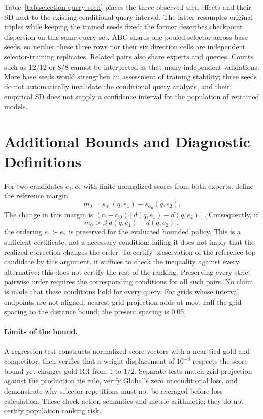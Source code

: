 \documentclass[11pt,a4paper]{article}
\begin{document}
Table~\ref{tab:selection-query-seed} places the three observed seed effects and their SD next to the existing conditional query interval. The latter resamples original triples while keeping the trained seeds fixed; the former describes checkpoint dispersion on this same query set. ADC shares one pooled selector across base seeds, so neither these three rows nor their six direction cells are independent selector-training replicates. Related pairs also share experts and queries. Counts such as 12/12 or 8/8 cannot be interpreted as that many independent validations. More base seeds would strengthen an assessment of training stability; three seeds do not automatically invalidate the conditional query analysis, and their empirical SD does not supply a confidence interval for the population of retrained models.


\FloatBarrier

\section{Additional Bounds and Diagnostic Definitions}
\label{app:bound}
For two candidates $e_1,e_2$ with finite normalized scores from both experts, define the reference margin
\begin{equation}
m_0=s_{\alpha_0}(q,e_1)-s_{\alpha_0}(q,e_2).
\end{equation}
The change in this margin is $(\alpha-\alpha_0)[d(q,e_1)-d(q,e_2)]$. Consequently, if
\begin{equation}
m_0>\beta|d(q,e_1)-d(q,e_2)|,
\label{eq:margin-sufficient}
\end{equation}
the ordering $e_1\succ e_2$ is preserved for the evaluated bounded policy. This is a sufficient certificate, not a necessary condition: failing it does not imply that the realized correction changes the order. To certify preservation of the reference top candidate by this argument, it suffices to check the inequality against every alternative; this does not certify the rest of the ranking. Preserving every strict pairwise order requires the corresponding conditions for all such pairs. No claim is made that these conditions hold for every query. For grids whose interval endpoints are not aligned, nearest-grid projection adds at most half the grid spacing to the distance bound; the present spacing is 0.05.

\paragraph{Limits of the bound.}
A regression test constructs normalized score vectors with a near-tied gold and competitor, then verifies that a weight displacement of $10^{-6}$ respects the score bound yet changes gold RR from 1 to $1/2$. Separate tests match grid projection against the production tie rule, verify Global's zero unconditional loss, and demonstrate why selector repetitions must not be averaged before loss calculation. These check action semantics and metric arithmetic; they do not certify population ranking risk.
\end{document}
